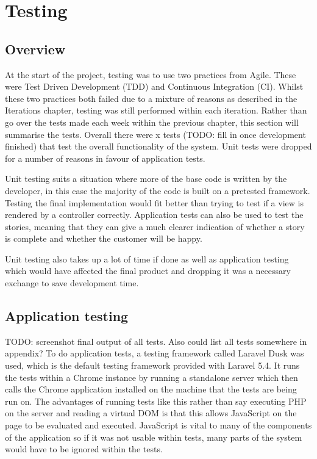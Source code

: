 \chapter{Testing}

\section{Overview}
At the start of the project, testing was to use two practices from Agile. These were Test Driven Development (TDD) and Continuous Integration (CI). Whilst these two practices both failed due to a mixture of reasons as described in the Iterations chapter, testing was still performed within each iteration. Rather than go over the tests made each week within the previous chapter, this section will summarise the tests. Overall there were x tests (TODO: fill in once development finished) that test the overall functionality of the system. Unit tests were dropped for a number of reasons in favour of application tests.

Unit testing suits a situation where more of the base code is written by the developer, in this case the majority of the code is built on a pretested framework. Testing the final implementation would fit better than trying to test if a view is rendered by a controller correctly. Application tests can also be used to test the stories, meaning that they can give a much clearer indication of whether a story is complete and whether the customer will be happy.

Unit testing also takes up a lot of time if done as well as application testing which would have affected the final product and dropping it was a necessary exchange to save development time.

\section{Application testing}
TODO: screenshot final output of all tests. Also could list all tests somewhere in appendix?
To do application tests, a testing framework called Laravel Dusk was used, which is the default testing framework provided with Laravel 5.4\cite{dusk}\cite{dusk-desc}. It runs the tests within a Chrome instance by running a standalone server which then calls the Chrome application installed on the machine that the tests are being run on. The advantages of running tests like this rather than say executing PHP on the server and reading a virtual DOM is that this allows JavaScript on the page to be evaluated and executed. JavaScript is vital to many of the components of the application so if it was not usable within tests, many parts of the system would have to be ignored within the tests.

